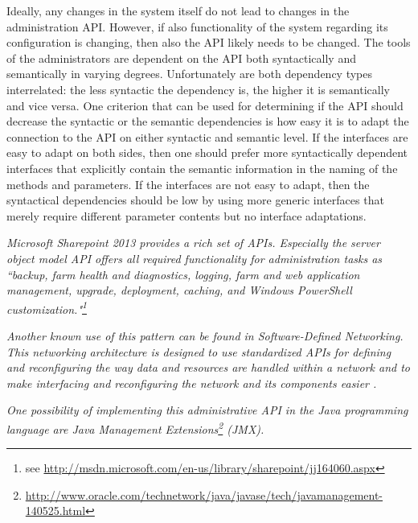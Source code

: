 Ideally, any changes in the system itself do not lead to changes in the administration API. However, if also functionality of the system regarding its configuration is changing, then also the API likely needs to be changed. The tools of the administrators are dependent on the API both syntactically and semantically in varying degrees. Unfortunately are both dependency types interrelated: the less syntactic the dependency is, the higher it is semantically and vice versa. One criterion that can be used for determining if the API should decrease the syntactic or the semantic dependencies is how easy it is to adapt the connection to the API on either syntactic and semantic level. If the interfaces are easy to adapt on both sides, then one should prefer more syntactically dependent interfaces that explicitly contain the semantic information in the naming of the methods and parameters. If the interfaces are not easy to adapt, then the syntactical dependencies should be low by using more generic interfaces that merely require different parameter contents but no interface adaptations.  



\textit{Microsoft Sharepoint 2013 provides a rich set of APIs. Especially the server object model API offers all required functionality for administration tasks as ``backup, farm health and diagnostics, logging, farm and web application management, upgrade, deployment, caching, and Windows PowerShell customization."\footnote{see \url{http://msdn.microsoft.com/en-us/library/sharepoint/jj164060.aspx}}}

\textit{Another known use of this pattern can be found in Software-Defined Networking. This networking architecture is designed to use standardized APIs for defining and reconfiguring the way data and resources are handled within a network and to make interfacing and reconfiguring the network and its components easier \cite{Kirkpatrick2013}.}

\textit{One possibility of implementing this administrative API in the Java programming language are Java Management Extensions\footnote{\url{http://www.oracle.com/technetwork/java/javase/tech/javamanagement-140525.html}} (JMX). }

%
%
%
